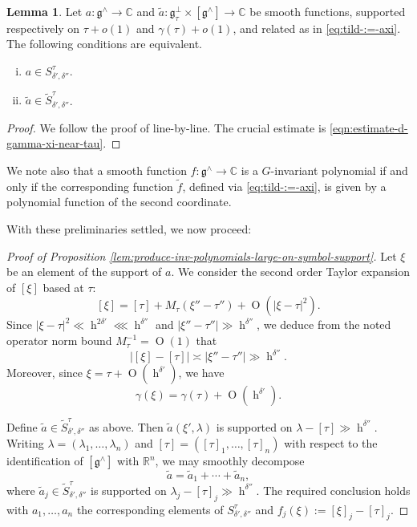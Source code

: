\documentclass[reqno]{amsart}
\DeclareMathOperator{\h}{h}
\def\O{\operatorname{O}}
\theoremstyle{plain} \newtheorem{theorem} {Theorem}
\theoremstyle{definition} \newtheorem{definition} [theorem] {Definition}
\theoremstyle{itplain} %
\newtheorem{lemma}[theorem]{Lemma}
\numberwithin{equation}{section}
\numberwithin{theorem}{section}
\begin{document}
\begin{lemma}
  Let $a : \mathfrak{g}^\wedge \rightarrow \mathbb{C}$ and $\tilde{a} : \mathfrak{g}_\tau^{\perp} \times [\mathfrak{g}^\wedge] \rightarrow \mathbb{C}$ be smooth functions, supported respectively on $\tau + o(1)$ and $\gamma(\tau) + o(1)$, and related as in \eqref{eq:tild-:=-axi}.  The following conditions are equivalent.
  \begin{enumerate}[(i)]
  \item $a \in S_{\delta ', \delta ''}^{\tau}$.
  \item $\tilde{a} \in \tilde{S}^{\tau}_{\delta ', \delta ''}$.
  \end{enumerate}
\end{lemma}
\begin{proof}
  We follow the proof of \cite[Lemma 9.9]{2020arXiv201202187N} line-by-line.  The crucial estimate is \eqref{eqn:estimate-d-gamma-xi-near-tau}.  %
\end{proof}
We note also that a smooth function $f : \mathfrak{g}^\wedge \rightarrow \mathbb{C}$ is a $G$-invariant polynomial if and only if the corresponding function $\tilde{f}$, defined via \eqref{eq:tild-:=-axi}, is given by a polynomial function of the second coordinate.

With these preliminaries settled, we now proceed:
\begin{proof}[Proof of Proposition \ref{lem:produce-inv-polynomials-large-on-symbol-support}]
  Let $\xi$ be an element of the support of $a$.  We consider the second order Taylor expansion of $[\xi]$ based at $\tau$: %
  \[
    [\xi] = [\tau] + M_\tau (\xi '' - \tau '') + \O(|\xi - \tau |^2).
  \]
  Since $|\xi - \tau |^2 \ll \h^{2 \delta '} \lll \h^{\delta ''}$ and $|\xi '' - \tau ''| \gg \h^{\delta ''}$, we deduce from the noted operator norm bound $M_\tau ^{-1} = \O(1)$ that
  \[
    |[\xi] - [\tau]| \asymp |\xi '' - \tau ''| \gg \h^{ \delta ''}.
  \]
  Moreover, since $\xi = \tau + \O(\h^{\delta '})$, we have
  \[
    \gamma(\xi) = \gamma(\tau) + \O(\h^{\delta '}).
  \]

  Define $\tilde{a} \in \tilde{S}^{\tau}_{\delta ', \delta ''}$ as above.  Then $\tilde{a}(\xi ', \lambda)$ is supported on $\lambda - [\tau] \gg \h^{ \delta ''}$.  Writing $\lambda = (\lambda_1,\dotsc,\lambda_n)$ and $[\tau] = ([\tau]_1,\dotsc,[\tau]_n)$ with respect to the identification of $[\mathfrak{g}^\wedge]$ with $\mathbb{R}^n$, we may smoothly decompose
  \[
    \tilde{a} = \tilde{a}_1 + \dotsb + \tilde{a}_n,
  \]
  where $\tilde{a}_j \in \tilde{S}^{\tau}_{\delta ', \delta ''}$ is supported on $\lambda_j - [\tau]_j \gg \h^{\delta ''}$.  The required conclusion holds with $a_1,\dotsc,a_n$ the corresponding elements of $S^{\tau}_{\delta ', \delta ''}$ and $f_j(\xi) := [\xi]_j - [\tau]_j$.
\end{proof}
\end{document}
